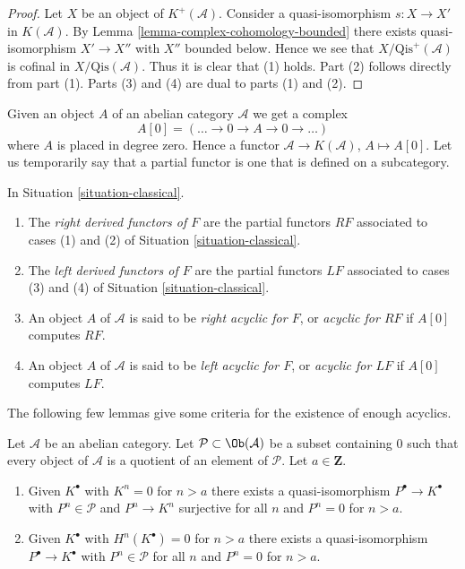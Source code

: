 \begin{proof}
Let $X$ be an object of $K^{+}(\mathcal{A})$.
Consider a quasi-isomorphism $s : X \to X'$ in $K(\mathcal{A})$.
By
Lemma \ref{lemma-complex-cohomology-bounded}
there exists quasi-isomorphism $X' \to X''$ with $X''$ bounded below.
Hence we see that $X/\text{Qis}^+(\mathcal{A})$ is cofinal
in $X/\text{Qis}(\mathcal{A})$. Thus it is clear that (1) holds.
Part (2) follows directly from part (1).
Parts (3) and (4) are dual to parts (1) and (2).
\end{proof}

\noindent
Given an object $A$ of an abelian category $\mathcal{A}$ we get a complex
$$
A[0] = ( \ldots \to 0 \to A \to 0 \to \ldots )
$$
where $A$ is placed in degree zero. Hence a functor
$\mathcal{A} \to K(\mathcal{A})$, $A \mapsto A[0]$.
Let us temporarily say that a partial functor is one that is
defined on a subcategory.

\begin{definition}
\label{definition-derived-functor}
In
Situation \ref{situation-classical}.
\begin{enumerate}
\item The {\it right derived functors of $F$} are the partial functors
$RF$ associated to cases (1) and (2) of
Situation \ref{situation-classical}.
\item The {\it left derived functors of $F$} are the partial functors
$LF$ associated to cases (3) and (4) of
Situation \ref{situation-classical}.
\item An object $A$ of $\mathcal{A}$ is said to be
{\it right acyclic for $F$}, or {\it acyclic for $RF$}
if $A[0]$ computes $RF$.
\item An object $A$ of $\mathcal{A}$ is said to be
{\it left acyclic for $F$}, or {\it acyclic for $LF$}
if $A[0]$ computes $LF$.
\end{enumerate}
\end{definition}

\noindent
The following few lemmas give some criteria for the existence of
enough acyclics.

\begin{lemma}
\label{lemma-subcategory-left-resolution}
Let $\mathcal{A}$ be an abelian category. Let
$\mathcal{P} \subset \Ob(\mathcal{A})$ be a subset containing $0$
such that every object of $\mathcal{A}$ is a quotient of an element of
$\mathcal{P}$. Let $a \in \mathbf{Z}$.
\begin{enumerate}
\item Given $K^\bullet$ with $K^n = 0$ for $n > a$
there exists a quasi-isomorphism $P^\bullet \to K^\bullet$
with $P^n \in \mathcal{P}$ and $P^n \to K^n$ surjective
for all $n$ and $P^n = 0$ for $n > a$.
\item Given $K^\bullet$ with $H^n(K^\bullet) = 0$ for $n > a$
there exists a quasi-isomorphism $P^\bullet \to K^\bullet$
with $P^n \in \mathcal{P}$ for all $n$ and $P^n = 0$ for $n > a$.
\end{enumerate}
\end{lemma}

